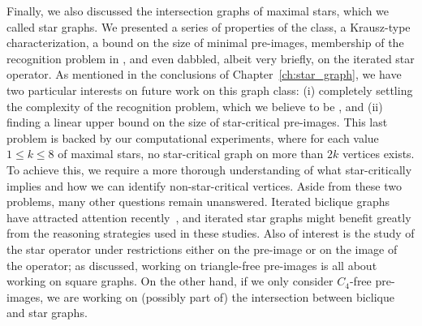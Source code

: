 Finally, we also discussed the intersection graphs of maximal stars, which we called star graphs.
We presented a series of properties of the class, a Krausz-type characterization, a bound on the size of minimal pre-images, membership of the recognition problem in \NP, and even dabbled, albeit very briefly, on the iterated star operator.
As mentioned in the conclusions of Chapter~\ref{ch:star_graph}, we have two particular interests on future work on this graph class: (i) completely settling the complexity of the recognition problem, which we believe to be \NPc, and (ii) finding a linear upper bound on the size of star-critical pre-images.
This last problem is backed by our computational experiments, where for each value $1 \leq k \leq 8$ of maximal stars, no star-critical graph on more than $2k$ vertices exists.
To achieve this, we require  a more thorough understanding of what star-critically implies and how we can identify non-star-critical vertices.
Aside from these two problems, many other questions remain unanswered.
Iterated biclique graphs have attracted attention recently~\cite{biclique_iterated}, and iterated star graphs might benefit greatly from the reasoning strategies used in these studies.
Also of interest is the study of the star operator under restrictions either on the pre-image or on the image of the operator; as discussed, working on triangle-free pre-images is all about working on square graphs.
On the other hand, if we only consider $C_4$-free pre-images, we are working on (possibly part of) the intersection between biclique and star graphs.






